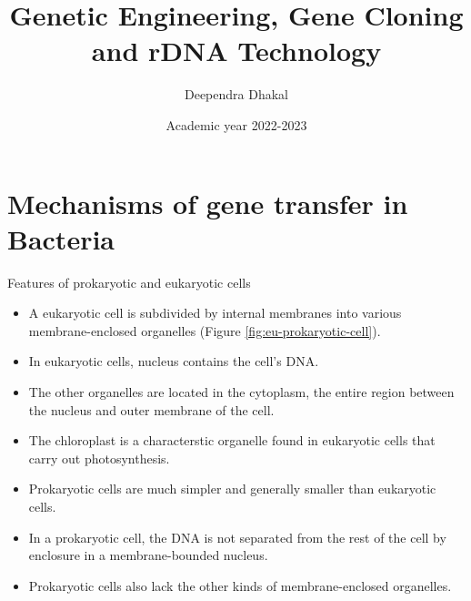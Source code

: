 \documentclass[
  ignorenonframetext,
  aspectratio=169]{beamer}
\title{Genetic Engineering, Gene Cloning and rDNA Technology}
\author{Deependra Dhakal}
\date{Academic year 2022-2023}
\institute{College of Natural Resource Management, Tikapur,
Kailali \and Agriculture and Forestry University}
\providecommand{\tightlist}{%
  \setlength{\itemsep}{0pt}\setlength{\parskip}{0pt}}
\begin{document}
\frame{\titlepage}

\begin{frame}[allowframebreaks]
  \tableofcontents[hideallsubsections]
\end{frame}
\hypertarget{mechanisms-of-gene-transfer-in-bacteria}{%
\section{Mechanisms of gene transfer in
Bacteria}\label{mechanisms-of-gene-transfer-in-bacteria}}

\begin{frame}{Features of prokaryotic and eukaryotic cells}
\protect\hypertarget{features-of-prokaryotic-and-eukaryotic-cells}{}
\begin{itemize}
\tightlist
\item
  A eukaryotic cell is subdivided by internal membranes into various
  membrane-enclosed organelles (Figure \ref{fig:eu-prokaryotic-cell}).
\item
  In eukaryotic cells, nucleus contains the cell's DNA.
\item
  The other organelles are located in the cytoplasm, the entire region
  between the nucleus and outer membrane of the cell.
\item
  The chloroplast is a characterstic organelle found in eukaryotic cells
  that carry out photosynthesis.
\item
  Prokaryotic cells are much simpler and generally smaller than
  eukaryotic cells.
\item
  In a prokaryotic cell, the DNA is not separated from the rest of the
  cell by enclosure in a membrane-bounded nucleus.
\item
  Prokaryotic cells also lack the other kinds of membrane-enclosed
  organelles.
\end{itemize}
\end{frame}
\end{document}
